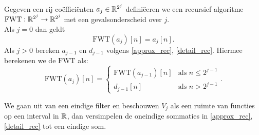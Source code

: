 \begin{algo}
  Gegeven een rij co\"effici\"enten $a_j\in\mathbb{R}^{2^j}$ defini\"eeren we een recursief
  algoritme $\mathrm{FWT}:\mathbb{R}^{2^j}\to\mathbb{R}^{2^j}$ met een gevalsonderscheid over $j$.\\
  Als $j=0$ dan geldt
  \[
  \mathrm{FWT}(a_j)[n] = a_j[n].
  \]
  Als $j>0$ bereken $a_{j-1}$ en $d_{j-1}$ volgens \eqref{approx_rec}, \eqref{detail_rec}.
  Hiermee berekenen we de $\mathrm{FWT}$ als:
  \begin{equation}
    \label{FWT_cases}
    \mathrm{FWT}(a_j)[n] = \begin{cases}
      \mathrm{FWT}(a_{j-1})[n] & \text{als } n\leq 2^{j-1} \\
      d_{j-1}[n] & \text{als } n>2^{j-1} \end{cases}.
  \end{equation}
\end{algo}
We gaan uit van een eindige filter en beschouwen $V_j$ als een ruimte van functies op een interval in $\mathbb{R}$, 
dan versimpelen de oneindige sommaties in \eqref{approx_rec}, \eqref{detail_rec} tot een eindige som. 

